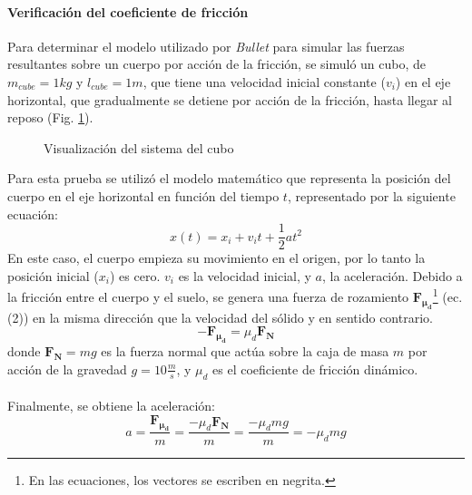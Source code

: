 \documentclass{article}
\begin{document}
\paragraph{Verificaci\'on del coeficiente de fricci\'on}\mbox{}

Para determinar el modelo utilizado por \textit{Bullet} para simular las fuerzas resultantes sobre un cuerpo por acci\'on de la fricci\'on, se simul\'o un cubo, de $m_{cube}=1kg$ y $l_{cube}=1m$, que tiene una velocidad inicial constante ($v_{i}$) en el eje horizontal, que gradualmente se detiene por acci\'on de la fricci\'on, hasta llegar al reposo (Fig. \ref{fig:translatingCube}).\\
\begin{figure}[H]%
  \centering
    \caption{Visualizaci\'on del sistema del cubo}
    \label{fig:translatingCube} 
\end{figure}
\noindent Para esta prueba se utiliz\'o el modelo matem\'atico que representa la posici\'on del cuerpo en el eje horizontal en funci\'on del tiempo $t$, representado por la siguiente ecuaci\'on: 
 \begin{equation}
  x(t) = x_i +v_i t+\frac{1}{2} at^2
\end{equation}
En este caso, el cuerpo empieza su movimiento en el origen, por lo tanto la posici\'on inicial ($x_i$) es cero. $v_{i}$ es la velocidad inicial, y $a$, la aceleraci\'on. Debido a la fricci\'on entre el cuerpo y el suelo, se genera una fuerza de rozamiento $\boldsymbol{ F_{\mu_{d}} } $\footnote{En las ecuaciones, los vectores se escriben en negrita.} (ec. (2)) en la misma direcci\'on que la velocidad del s\'olido y en sentido contrario.
\begin{equation}
  -\boldsymbol{ F_{\mu_d} } = \mu_d \boldsymbol{F_N} 
\end{equation}
donde $\boldsymbol{F_N}=mg$ es la fuerza normal que act\'ua sobre la caja de masa $m$ por acci\'on de la gravedad $g = 10 \frac{m}{s}$, y $\mu_d$ es el coeficiente de fricci\'on din\'amico.\\\\
Finalmente, se obtiene la aceleraci\'on:
 \begin{equation}
  a = \frac{  \boldsymbol{F_{\mu_d}}   }{m}= \frac{-\mu_d\boldsymbol{F_N}}{m} = \frac{-\mu_d mg}{m} = -\mu_dmg
\end{equation}
\end{document}
